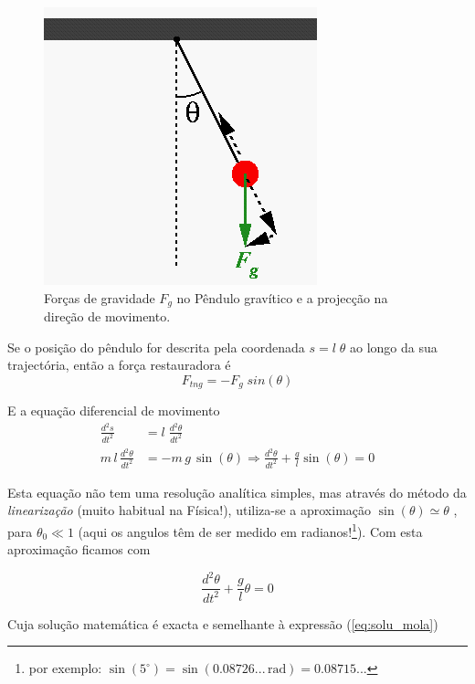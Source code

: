 \documentclass[a4paper,twoside,12pt]{article}      %
\begin{document}
\begin{figure}
	[!htbp] \centering 
	
	\includegraphics[width=0.5	\textwidth]{forcespend} \caption{Forças de gravidade $F_g$ no Pêndulo gravítico e a projecção na direção de movimento. \label{fig:3} } 
\end{figure}

Se o posição do pêndulo for descrita pela coordenada $s= l\; \theta$ ao longo da sua trajectória, 
então a força restauradora é 
\begin{equation}
	\label{eq:4} 
F_{tng} = - F_{g} \; sin(\theta) 
\end{equation}

E a equação diferencial de movimento 
\begin{align}
	\label{eq:5} 
	\frac{d^2 s}{dt^2} &=  l\;  \frac{d^2 \theta}{dt^2} \nonumber \\
	m \, l \, \frac{d^2 \theta}{dt^2} &= - m \,  g \, \sin(\theta)  \Rightarrow \frac{d^2 \theta}{dt^2} + \frac{g}{l} \sin(\theta) = 0
\end{align}

Esta equação não tem uma resolução analítica simples, mas através do método  da \emph{linearização} (muito habitual na Física!), utiliza-se a aproximação $ \sin(\theta) \simeq \theta$ , para  $\theta_0 \ll 1$ (aqui  os angulos têm de ser medido em radianos!\footnote{ por exemplo: $\sin(5 ^{\circ}) = \sin(0.08726... \, \text{rad}) = 0.08715... $}).
Com esta aproximação ficamos com 

\begin{equation}
	\label{eq:6} 
	 \frac{d^2 \theta}{dt^2} + \frac{g}{l} \theta =0
\end{equation}

Cuja solução matemática é exacta e semelhante à expressão (\ref{eq:solu_mola})
\end{document}
